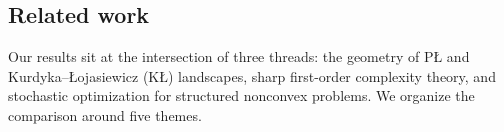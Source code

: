\documentclass[11pt]{article}
\begin{document}

\subsection{Related work}
\label{sec:related-work}

Our results sit at the intersection of three threads: the geometry of P\L{} and Kurdyka--\L ojasiewicz (K\L)
landscapes, sharp first-order complexity theory, and stochastic optimization for structured nonconvex problems. We
organize the comparison around five themes.
\end{document}
